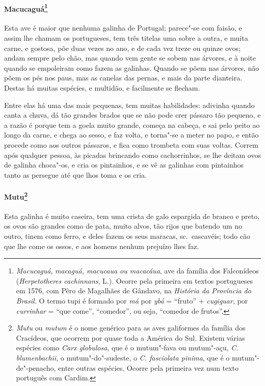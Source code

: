 \paragraph{Macucaguá\footnote{ \textit{Macucaguá}, \textit{macaguá,
macucaua ou macacáua}, ave da família dos Falconídeos
(\textit{Herpetotheres cachinnans}, L.). Ocorre pela primeira em textos
portugueses em 1576, com Pêro de Magalhães de Gândavo, na \textit{História da
Província do Brasil.} O termo tupi é formado por \textit{má} por
\textit{ybá} = ``fruto'' + \textit{cugiguar}, por \textit{currinhar} = 
``que come'', ``comedor'', ou seja, ``comedor de frutos''.}} Esta
ave é maior que nenhuma galinha de Portugal; parece"-se com faisão, e
assim lhe chamam os portugueses, tem três titelas uma sobre a outra, e
muita carne, e gostosa, põe duas vezes no ano, e de cada vez treze ou
quinze ovos; andam sempre pelo chão, mas quando vem gente se sobem nas
árvores, e à noite quando se empoleiram como fazem as galinhas. Quando
se põem nas árvores, não põem os pés nos paus, mas as canelas das
pernas, e mais da parte dianteira. Destas há muitas espécies, e
multidão, e facilmente se flecham.

 Entre elas há uma das mais pequenas, tem muitas habilidades: adivinha
quando canta a chuva, dá tão grandes brados que se não pode crer pássaro
tão pequeno, e a razão é porque tem a goela muito grande, começa na
cabeça, e sai pelo peito ao longo da carne, e chega ao sesso, e faz
volta, e torna"-se a meter no papo, e então procede como aos outros
pássaros, e fica como trombeta com suas voltas. Correm após qualquer
pessoa, às picadas brincando como cachorrinhos, se lhe deitam ovos de
galinha choca"-os, e cria os pintainhos, e se vê as galinhas com
pintainhos tanto as persegue até que lhos toma e os cria. 

\paragraph{Mutu\footnote{ \textit{Mutu} ou \textit{mutum} é o nome
genérico para as aves galiformes da família dos Cracídeos, que ocorrem
por quase toda a América do Sul. Existem várias espécies como
\textit{Carx globulosa}, que é o mutum"-fava ou mutum"-açu, \textit{C.
blumenbachii}, o mutum"-do"-sudeste, o \textit{C. fasciolata pinima}, que
é o mutum"-de"-penacho, entre outras espécies. Ocorre pela primeira vez
num texto português com Cardim.}} Esta galinha é muito
caseira, tem uma crista de galo espargida de branco e preto, os ovos
são grandes como de pata, muito alvos, tão rijos que batendo um no
outro, tinem como ferro, e deles fazem os seus maracas, sc.~cascavéis;
todo cão que lhe come os ossos, e aos homens nenhum prejuízo lhes faz. 

